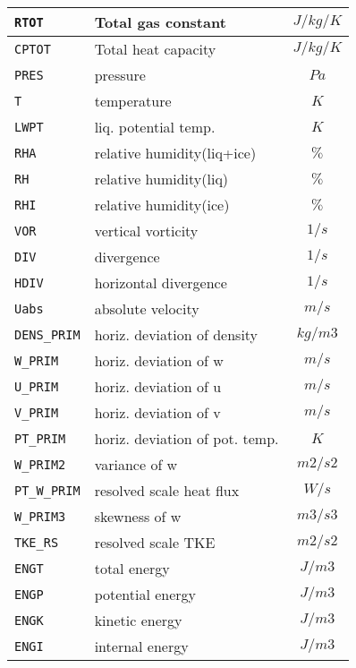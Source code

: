 \begin{tabularx}{150mm}{|l|X|c|}
  \verb|RTOT|   &  Total gas constant        & $J/kg/K$ \\\hline
  \verb|CPTOT|  &  Total heat capacity       & $J/kg/K$ \\\hline
  \verb|PRES|   &  pressure                  & $Pa$    \\\hline
  \verb|T|      &  temperature               & $K$     \\\hline
  \verb|LWPT|   &  liq. potential temp.      & $K$     \\\hline
  \verb|RHA|    &  relative humidity(liq+ice) & $\%$     \\\hline
  \verb|RH|     &  relative humidity(liq)     & $\%$     \\\hline
  \verb|RHI|    &  relative humidity(ice)     & $\%$     \\\hline
  \verb|VOR|    &  vertical vorticity        &  $1/s$   \\\hline
  \verb|DIV|    &  divergence                &  $1/s$   \\\hline
  \verb|HDIV|   &  horizontal divergence     &  $1/s$   \\\hline
  \verb|Uabs|   &  absolute velocity         &  $m/s$   \\\hline
  \verb|DENS_PRIM| & horiz. deviation of density    & $kg/m3$ \\\hline
  \verb|W_PRIM|    & horiz. deviation of w          & $m/s$   \\\hline
  \verb|U_PRIM|    & horiz. deviation of u          & $m/s$   \\\hline
  \verb|V_PRIM|    & horiz. deviation of v          & $m/s$   \\\hline
  \verb|PT_PRIM|   & horiz. deviation of pot. temp. & $K$     \\\hline
  \verb|W_PRIM2|   & variance of w                  & $m2/s2$ \\\hline
  \verb|PT_W_PRIM| & resolved scale heat flux       & $W/s$   \\\hline
  \verb|W_PRIM3|   & skewness of w                  & $m3/s3$ \\\hline
  \verb|TKE_RS|    & resolved scale TKE             & $m2/s2$ \\\hline
  \verb|ENGT|      & total energy                   & $J/m3$  \\\hline
  \verb|ENGP|      & potential energy               & $J/m3$  \\\hline
  \verb|ENGK|      & kinetic energy                 & $J/m3$  \\\hline
  \verb|ENGI|      & internal energy                & $J/m3$  \\\hline
 \end{tabularx}

